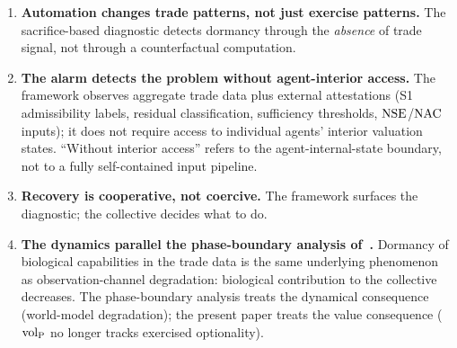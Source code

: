 \begin{enumerate}
\item \textbf{Automation changes trade patterns, not just exercise
  patterns.}  The sacrifice-based diagnostic detects dormancy
  through the \emph{absence} of trade signal, not through a
  counterfactual computation.
\item \textbf{The alarm detects the problem without
  agent-interior access.}  The framework observes aggregate
  trade data plus external attestations (S1 admissibility
  labels, residual classification, sufficiency thresholds,
  $\mathrm{NSE}$/$\mathrm{NAC}$ inputs); it does not require access to
  individual agents' interior valuation states.  ``Without
  interior access'' refers to the agent-internal-state
  boundary, not to a fully self-contained input pipeline.
\item \textbf{Recovery is cooperative, not coercive.}  The
  framework surfaces the diagnostic; the collective decides what
  to do.
\item \textbf{The dynamics parallel the phase-boundary analysis
  of~\citep[Phase~Redundancy]{lasser2026phase}.}  Dormancy of biological
  capabilities in the trade data is the same underlying phenomenon
  as observation-channel degradation: biological contribution to
  the collective decreases.  The phase-boundary analysis treats
  the dynamical consequence (world-model degradation); the present
  paper treats the value consequence (${\operatorname{vol}_{\mathrm{P}}}$ no longer tracks
  exercised optionality).
\end{enumerate}
